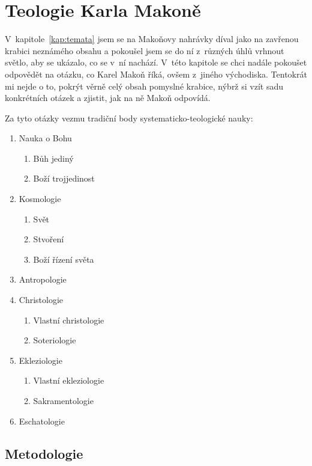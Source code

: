 \chapter{Teologie Karla Makoně}
\label{kap:teologie}

V~kapitole~\ref{kap:temata} jsem se na Makoňovy nahrávky díval jako na zavřenou
krabici neznámého obsahu a pokoušel jsem se do ní z~různých úhlů vrhnout světlo,
aby se ukázalo, co se v~ní nachází. V~této kapitole se chci nadále pokoušet
odpovědět na otázku, co Karel Makoň říká, ovšem z~jiného východiska. Tentokrát
mi nejde o to, pokrýt věrně celý obsah pomyslné krabice, nýbrž si vzít sadu
konkrétních otázek a zjistit, jak na ně Makoň odpovídá.

Za tyto otázky vezmu tradiční body systematicko-teologické nauky:
\begin{enumerate}
    \item{%
        Nauka o Bohu
        \begin{enumerate}
            \item{Bůh jediný}
            \item{Boží trojjedinost}
        \end{enumerate}
    }
    \item{%
        Kosmologie
        \begin{enumerate}
            \item{Svět}
            \item{Stvoření}
            \item{Boží řízení světa}
        \end{enumerate}
    }
    \item{Antropologie}
    \item{%
        Christologie
        \begin{enumerate}
            \item{Vlastní christologie}
            \item{Soteriologie}
        \end{enumerate}
    }
    \item{%
        Ekleziologie
        \begin{enumerate}
            \item{Vlastní ekleziologie}
            \item{Sakramentologie}
        \end{enumerate}
    }
    \item{Eschatologie}
\end{enumerate}

\section{Metodologie}


